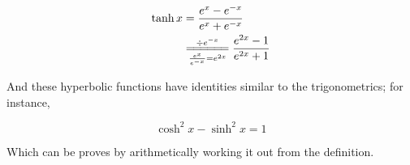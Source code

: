 \documentclass{article}
\begin{document}
\begin{align*}
\tanh x&=\frac{e^x-e^{-x}}{e^x+e^{-x}}\\
&\overset{\div e^{-x}}{\underset{\frac{e^x}{e^{-x}}=e^{2x}}{=\joinrel=\joinrel=\joinrel=\joinrel=\joinrel=}}\frac{e^{2x}-1}{e^{2x}+1}
\end{align*}

\vspace{10pt}

And these hyperbolic functions have identities similar to the trigonometrics; for instance,

\[\cosh^2x-\sinh^2x=1\]

\vspace{10pt}

Which can be proves by arithmetically working it out from the definition.
\end{document}

